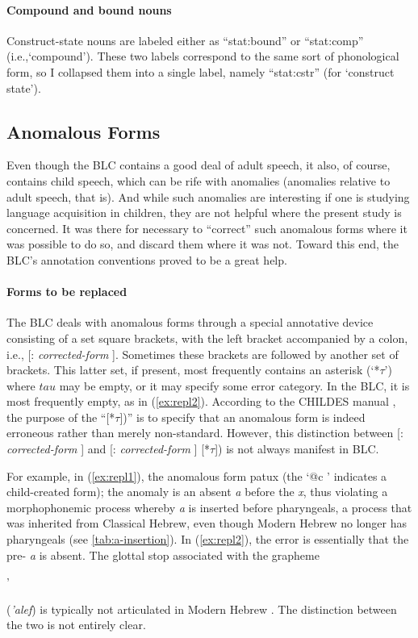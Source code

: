 \paragraph{Compound and bound nouns}
Construct-state nouns are labeled either as ``\textsf{stat:bound}'' 
or ``\textsf{stat:comp}'' (i.e.,`compound'). 
These two labels correspond to the same sort of phonological form, 
 so I collapsed them into a single label, namely 
``\textsf{stat:cstr}'' (for `construct state').

\subsection{Anomalous Forms}\label{sec:anomolous}

Even though the \ac{BLC} contains a good deal of adult speech, it also, 
of course, contains child speech, which  
can be rife with anomalies (anomalies relative to adult speech, that is). 
And while such anomalies are interesting if one is studying language acquisition 
in children, they are not helpful where the present study is concerned. It 
was there for necessary to ``correct'' such anomalous forms where it was 
possible to do so, and discard them where it was not. Toward this end, 
the \ac{BLC}'s annotation conventions proved to be a great help.

\paragraph{Forms to be replaced}
The \ac{BLC} deals with anomalous forms through a special 
annotative device consisting of a set square brackets, with the left bracket 
accompanied
by a colon, i.e., \textsf{[: \textit{corrected-form} ]}. Sometimes these brackets 
are followed by another set
of brackets. This latter set, if present, most frequently contains an asterisk 
(`*$\tau$') where $tau$ may be empty, or it may specify some error category. 
In the \ac{BLC}, it is most frequently empty, as in (\ref{ex:repl2}). 
According to the CHILDES manual \citep{macwhinney:2000b}, the purpose 
of the ``\textsf{[*$\tau$])}'' 
is to specify that an anomalous form is 
indeed erroneous rather than merely non-standard. 
However, this distinction between 
\textsf{[: \textit{corrected-form} ]} and 
\textsf{[: \textit{corrected-form} ] [*{$\tau$}])} is not always manifest in \ac{BLC}.

For example, in (\ref{ex:repl1}), the anomalous 
form \textsf{patux} 
(the `\textsf{@c} ' indicates a child-created form); 
the anomaly is an absent \textit{a} before the \textit{x}, thus violating 
a morphophonemic process 
whereby \textit{a} is inserted before pharyngeals, a process that was inherited 
from Classical Hebrew, even though Modern Hebrew no longer has pharyngeals (see \ref{tab:a-insertion}).
In (\ref{ex:repl2}), the error is essentially that the pre-\textit{} 
\textit{a} is absent. The glottal stop
associated with the grapheme \begin{cjhebrew}'\end{cjhebrew} (\textit{'alef}) 
is typically not articulated in Modern Hebrew \citep{montoya:2014}. The distinction
between the two is not entirely clear.

